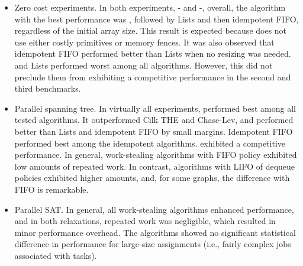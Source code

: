 \begin{itemize}
\item Zero cost experiments. In both experiments, \Puts{}-\Takes{} and \Puts-\Steals{}, overall, the algorithm with the best performance was \NCWSM, followed by \NCWSM Lists and then idempotent FIFO, regardless of the initial array size. This result is expected because \NCWSM does not use either costly primitives or memory fences.  It was also observed that idempotent FIFO performed better than \NCWSM Lists when no resizing was needed. \BNCWSM and \BNCWSM Lists performed worst among all algorithms. However, this did not preclude them from exhibiting a competitive performance in the second and third benchmarks.

\item Parallel spanning tree. In virtually all experiments, \NCWSM performed best among all tested algorithms. It outperformed Cilk THE and Chase-Lev, and performed better than \NCWSM Lists and idempotent FIFO by small margins. Idempotent FIFO performed best among the idempotent algorithms.  \BNCWSM exhibited a competitive performance.  In general, work-stealing algorithms with FIFO policy exhibited low amounts of repeated work. In contrast, algorithms with LIFO of dequeue policies exhibited higher amounts, and, for some graphs, the difference with FIFO is remarkable.


\item Parallel SAT. In general, all work-stealing algorithms enhanced performance, and in both relaxations, repeated work was negligible, which resulted in minor performance overhead. The algorithms showed no significant statistical difference in performance for large-size assignments (i.e., fairly complex jobs associated with tasks).

\end{itemize}


